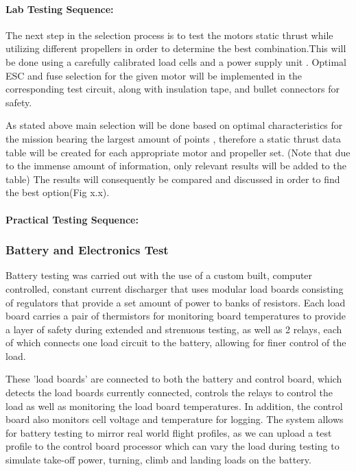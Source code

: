 \paragraph{Lab Testing Sequence:}

The next step in the selection process is to test the motors static thrust while utilizing different propellers in order to determine the best combination.This will be done using a carefully calibrated load cells and a power supply unit .
Optimal ESC and fuse selection for the given motor will be implemented in the corresponding test circuit, along with insulation tape, and bullet connectors for safety. 

As stated above main selection will be done based on optimal characteristics for the mission bearing the largest amount of points , therefore a static thrust data table will be created for each appropriate motor and propeller set.
(Note that due to the immense amount of information, only relevant results will be added to the table)
The results will consequently be compared and discussed in order to find the best option(Fig x.x). 


\paragraph{Practical Testing Sequence:}


\subsubsection{Battery and Electronics Test}
Battery testing was carried out with the use of a custom built, computer controlled, constant current discharger that uses modular load boards consisting of regulators that provide a set amount of power to banks of resistors. Each load board carries a pair of thermistors for monitoring board temperatures to provide a layer of safety during extended and strenuous testing, as well as 2 relays, each of which connects one load circuit to the battery, allowing for finer control of the load. 

These 'load boards' are connected to both the battery and control board, which detects the load boards currently connected, controls the relays to control the load as well as monitoring the load board temperatures. In addition, the control board also monitors cell voltage and temperature for logging. The system allows for battery testing to mirror real world flight profiles, as we can upload a test profile to the control board processor which can vary the load during testing to simulate take-off power, turning, climb and landing loads on the battery.


